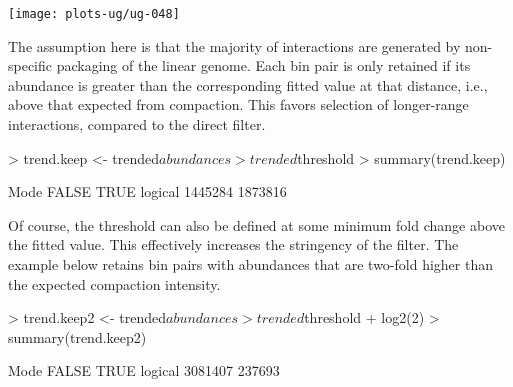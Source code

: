 \documentclass[12pt]{report}
\renewenvironment{Schunk}{\vspace{0pt}}{\vspace{0pt}}
\begin{document}
\begin{Schunk}
\end{Schunk}

\begin{center}
\texttt{[image: plots-ug/ug-048]}
\end{center}

The assumption here is that the majority of interactions are generated by non-specific packaging of the linear genome.
Each bin pair is only retained if its abundance is greater than the corresponding fitted value at that distance, i.e., above that expected from compaction. 
This favors selection of longer-range interactions, compared to the direct filter.

\begin{Schunk}
\begin{Sinput}
> trend.keep <- trended$abundances > trended$threshold
> summary(trend.keep)
\end{Sinput}
\begin{Soutput}
   Mode   FALSE    TRUE 
logical 1445284 1873816 
\end{Soutput}
\end{Schunk}


Of course, the threshold can also be defined at some minimum fold change above the fitted value.
This effectively increases the stringency of the filter.
The example below retains bin pairs with abundances that are two-fold higher than the expected compaction intensity.

\begin{Schunk}
\begin{Sinput}
> trend.keep2 <- trended$abundances > trended$threshold + log2(2)
> summary(trend.keep2)
\end{Sinput}
\begin{Soutput}
   Mode   FALSE    TRUE 
logical 3081407  237693 
\end{Soutput}
\end{Schunk}
\end{document}
